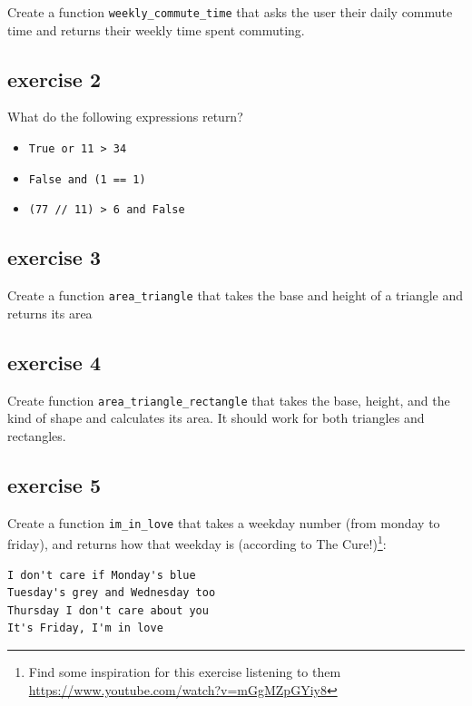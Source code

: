 \documentclass{tufte-handout}
\begin{document}
Create a function \Verb|weekly_commute_time| that asks the user their daily
commute time and returns their weekly time spent commuting.

\subsection{exercise 2}\label{sec:ex2}

What do the following expressions return?

\begin{itemize}
\item \Verb|True or 11 > 34|
\item \Verb|False and (1 == 1)|
\item \Verb|(77 // 11) > 6 and False|
\end{itemize}

\subsection{exercise 3}\label{sec:ex3}

Create a function \Verb|area_triangle| that takes the base and height of a
triangle and returns its area

\subsection{exercise 4}\label{sec:ex4}

Create function \Verb|area_triangle_rectangle| that takes the base, height,
and the kind of shape and calculates its area.  It should work for
both triangles and rectangles.

\subsection{exercise 5}\label{sec:ex5}

Create a function \Verb|im_in_love| that takes a weekday number (from
monday to friday), and returns how that weekday is (according to The
Cure!)\footnote{Find some inspiration for this exercise listening to
  them \url{https://www.youtube.com/watch?v=mGgMZpGYiy8}}:

\begin{lstlisting}
I don't care if Monday's blue
Tuesday's grey and Wednesday too
Thursday I don't care about you
It's Friday, I'm in love
\end{lstlisting}



\end{document}
